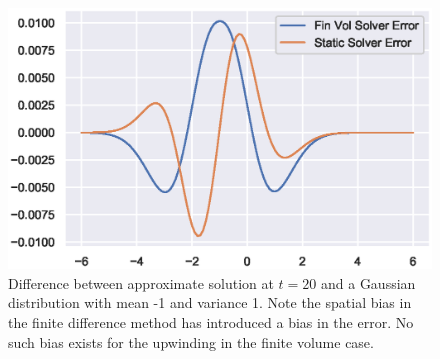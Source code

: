     \begin{figure}
        \centering
        \includegraphics[width=0.7\linewidth]{Figures/homkinerror}
        \caption[Error of the Schemes]{Difference between approximate solution at $t=20$ and a Gaussian distribution with mean -1 and variance 1. Note the spatial bias in the finite difference method has introduced a bias in the error. No such bias exists for the upwinding in the finite volume case.}
        \label{fig:homkinerror}
    \end{figure}

